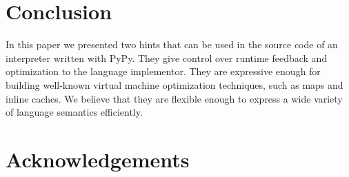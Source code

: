 \documentclass{sigplanconf}
\begin{document}


\section{Conclusion}

In this paper we presented two hints that can be used in the source code of an
interpreter written with PyPy. They give control over runtime feedback and
optimization to the language implementor. They are expressive enough for
building well-known virtual machine optimization techniques, such as maps and
inline caches. We believe that they are flexible enough to express a wide
variety of language semantics efficiently.


\section*{Acknowledgements}



\end{document}
